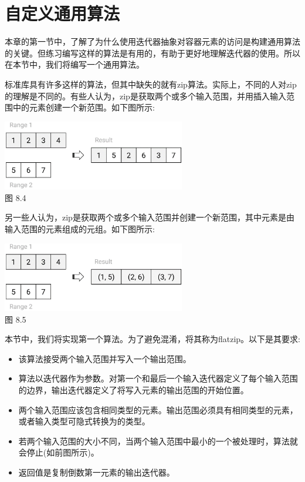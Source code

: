 \section{自定义通用算法}

本章的第一节中，了解了为什么使用迭代器抽象对容器元素的访问是构建通用算法的关键。但练习编写这样的算法是有用的，有助于更好地理解迭代器的使用。所以在本节中，我们将编写一个通用算法。

标准库具有许多这样的算法，但其中缺失的就有zip算法。实际上，不同的人对zip的理解是不同的。有些人认为，zip是获取两个或多个输入范围，并用插入输入范围中的元素创建一个新范围。如下图所示:

\begin{center}
\includegraphics[width=0.6\textwidth]{images/4.png}\\
图 8.4
\end{center}

另一些人认为，zip是获取两个或多个输入范围并创建一个新范围，其中元素是由输入范围的元素组成的元组。如下图所示:

\begin{center}
\includegraphics[width=0.6\textwidth]{images/5.png}\\
图 8.5
\end{center}

本节中，我们将实现第一个算法。为了避免混淆，将其称为flatzip。以下是其要求:

\begin{itemize}
\item
该算法接受两个输入范围并写入一个输出范围。

\item
算法以迭代器作为参数。对第一个和最后一个输入迭代器定义了每个输入范围的边界，输出迭代器定义了将写入元素的输出范围的开始位置。

\item
两个输入范围应该包含相同类型的元素。输出范围必须具有相同类型的元素，或者输入类型可隐式转换为的类型。

\item
若两个输入范围的大小不同，当两个输入范围中最小的一个被处理时，算法就会停止(如前图所示)。

\item
返回值是复制倒数第一元素的输出迭代器。
\end{itemize}

